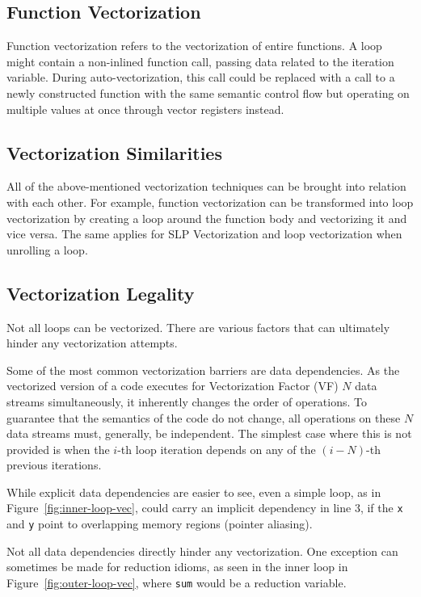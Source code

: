 \documentclass[sigplan,11pt,nonacm]{acmart}
\begin{document}
\subsection{Function Vectorization}
Function vectorization refers to the vectorization of entire functions. A loop might contain a
non-inlined function call, passing data related to the iteration variable. During auto-vectorization, 
this call could be replaced with a call to a newly constructed function with the same semantic 
control flow but operating on multiple values at once through vector registers instead.

\subsection{Vectorization Similarities}
All of the above-mentioned vectorization techniques can be brought into relation with each other. 
For example, function vectorization can be transformed into loop vectorization by creating a loop 
around the function body and vectorizing it and vice versa. The same applies for SLP Vectorization 
and loop vectorization when unrolling a loop.
 
\subsection{Vectorization Legality}
Not all loops can be vectorized. There are various factors that can ultimately hinder any
vectorization attempts.

Some of the most common vectorization barriers are data dependencies. As the vectorized version
of a code executes for Vectorization Factor (VF) $N$ data streams simultaneously, it inherently changes
the order of operations. To guarantee that the semantics of the code do not change, all
operations on these $N$ data streams must, generally, be independent. The simplest case
where this is not provided is when the $i$-th loop iteration depends on any of the $(i-N)$-th 
previous iterations.

While explicit data dependencies are easier to see, even a simple loop, as in 
Figure~\ref{fig:inner-loop-vec}, could carry an implicit dependency in line 3, if
the \texttt{x} and \texttt{y} point to overlapping memory regions (pointer aliasing).

Not all data dependencies directly hinder any vectorization. One exception can 
sometimes be made for reduction idioms, as seen in the inner loop in 
Figure~\ref{fig:outer-loop-vec}, where \texttt{sum} would be a reduction variable.
\end{document}
